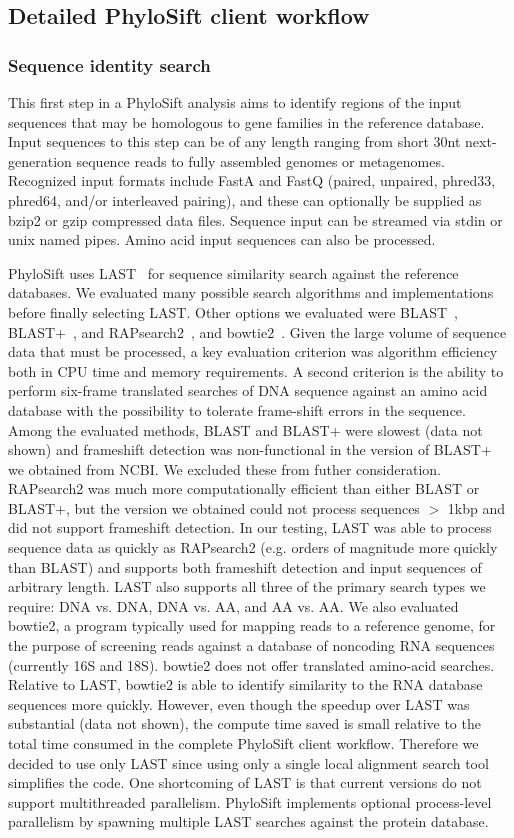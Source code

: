 \documentclass[10pt]{article}
\begin{document}
\subsection*{Detailed PhyloSift client workflow}
\subsubsection*{Sequence identity search}
This first step in a PhyloSift analysis aims to identify regions of the input sequences that may be homologous to gene families in the reference database.
Input sequences to this step can be of any length ranging from short 30nt next-generation sequence reads to fully assembled genomes or metagenomes.
Recognized input formats include FastA and FastQ (paired, unpaired, phred33, phred64, and/or interleaved pairing), and these can optionally be supplied as bzip2 or gzip compressed data files.
Sequence input can be streamed via stdin or unix named pipes.
Amino acid input sequences can also be processed.

PhyloSift uses LAST~\cite{Kiełbasa2011} for sequence similarity search against the reference databases.
We evaluated many possible search algorithms and implementations before finally selecting LAST.
Other options we evaluated were BLAST~\cite{Altschul1997}, BLAST+~\cite{Camacho2009}, and RAPsearch2~\cite{Zhao2011}, and bowtie2~\cite{Langmead2009}.
Given the large volume of sequence data that must be processed, a key evaluation criterion was algorithm efficiency both in CPU time and memory requirements.
A second criterion is the ability to perform six-frame translated searches of {DNA} sequence against an amino acid database with the possibility to tolerate frame-shift errors in the sequence.
Among the evaluated methods, BLAST and BLAST+ were slowest (data not shown) and frameshift detection was non-functional in the version of BLAST+ we obtained from NCBI. We excluded these from futher consideration.
RAPsearch2 was much more computationally efficient than either BLAST or BLAST+, but the version we obtained could not process sequences $>$ 1kbp and did not support frameshift detection.
In our testing, LAST was able to process sequence data as quickly as RAPsearch2 (e.g. orders of magnitude more quickly than BLAST) and supports both frameshift detection and input sequences of arbitrary length.
LAST also supports all three of the primary search types we require: {DNA} vs. {DNA}, {DNA} vs. AA, and AA vs. AA.
We also evaluated bowtie2, a program typically used for mapping reads to a reference genome, for the purpose of screening reads against a database of noncoding {RNA} sequences (currently 16S and 18S).
bowtie2 does not offer translated amino-acid searches.
Relative to LAST, bowtie2 is able to identify similarity to the {RNA} database sequences more quickly.
However, even though the speedup over LAST was substantial (data not shown), the compute time saved is small relative to the total time consumed in the complete PhyloSift client workflow.
Therefore we decided to use only LAST since using only a single local alignment search tool simplifies the code.
One shortcoming of LAST is that current versions do not support multithreaded parallelism.
PhyloSift implements optional process-level parallelism by spawning multiple LAST searches against the protein database.
\end{document}

